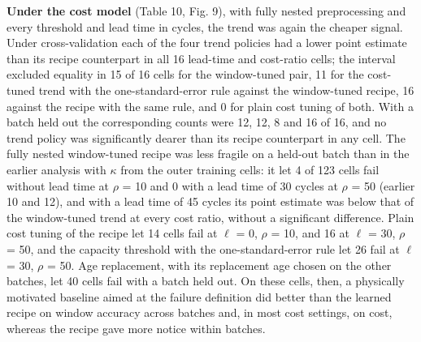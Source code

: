\documentclass[a4paper,fleqn,doubleblind]{cas-dc}
\begin{document}
\textbf{Under the cost model} (Table 10, Fig. 9), with fully nested preprocessing and every threshold and lead time in cycles, the trend was again the cheaper signal. Under cross-validation each of the four trend policies had a lower point estimate than its recipe counterpart in all 16 lead-time and cost-ratio cells; the interval excluded equality in 15 of 16 cells for the window-tuned pair, 11 for the cost-tuned trend with the one-standard-error rule against the window-tuned recipe, 16 against the recipe with the same rule, and 0 for plain cost tuning of both. With a batch held out the corresponding counts were 12, 12, 8 and 16 of 16, and no trend policy was significantly dearer than its recipe counterpart in any cell. The fully nested window-tuned recipe was less fragile on a held-out batch than in the earlier analysis with $\kappa$ from the outer training cells: it let 4 of 123 cells fail without lead time at $\rho$ = 10 and 0 with a lead time of 30 cycles at $\rho$ = 50 (earlier 10 and 12), and with a lead time of 45 cycles its point estimate was below that of the window-tuned trend at every cost ratio, without a significant difference. Plain cost tuning of the recipe let 14 cells fail at $\ell$ = 0, $\rho$ = 10, and 16 at $\ell$ = 30, $\rho$ = 50, and the capacity threshold with the one-standard-error rule let 26 fail at $\ell$ = 30, $\rho$ = 50. Age replacement, with its replacement age chosen on the other batches, let 40 cells fail with a batch held out. On these cells, then, a physically motivated baseline aimed at the failure definition did better than the learned recipe on window accuracy across batches and, in most cost settings, on cost, whereas the recipe gave more notice within batches.
\end{document}
